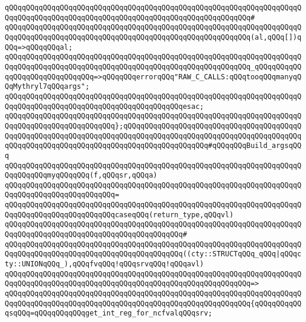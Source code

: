 \verb|qQQqqQQqqQQqqQQqqQQqqQQqqQQqqQQqqQQqqQQqqQQqqQQqqQQqqQQqqQQqqQQqqQQqqQQqqQQqqQQqqQQqqQQqqQQqqQQqqQQqqQQqqQQqqQQqqQQqqQQqqQQqqQQq#|\newline
\verb|qQQqqQQqqQQqqQQqqQQqqQQqqQQqqQQqqQQqqQQqqQQqqQQqqQQqqQQqqQQqqQQqqQQqqQQqqQQqqQQqqQQqqQQqqQQqqQQqqQQqqQQqqQQqqQQqqQQqqQQqqQQqqQQq(al,qQQq[])qQQq=>qQQqqQQqal;|\newline
\verb|qQQqqQQqqQQqqQQqqQQqqQQqqQQqqQQqqQQqqQQqqQQqqQQqqQQqqQQqqQQqqQQqqQQqqQQqqQQqqQQqqQQqqQQqqQQqqQQqqQQqqQQqqQQqqQQqqQQqqQQqqQQqqQQq_qQQqqQQqqQQqqQQqqQQqqQQqqQQqqQQq=>qQQqqQQqerrorqQQq"RAW_C_CALLS:qQQqtooqQQqmanyqQQqMythryl7qQQqargs";|\newline
\verb|qQQqqQQqqQQqqQQqqQQqqQQqqQQqqQQqqQQqqQQqqQQqqQQqqQQqqQQqqQQqqQQqqQQqqQQqqQQqqQQqqQQqqQQqqQQqqQQqqQQqqQQqqQQqqQQqesac;|\newline
\newline
\verb|qQQqqQQqqQQqqQQqqQQqqQQqqQQqqQQqqQQqqQQqqQQqqQQqqQQqqQQqqQQqqQQqqQQqqQQqqQQqqQQqqQQqqQQqqQQqqQQq};qQQqqQQqqQQqqQQqqQQqqQQqqQQqqQQqqQQqqQQqqQQqqQQqqQQqqQQqqQQqqQQqqQQqqQQqqQQqqQQqqQQqqQQqqQQqqQQqqQQqqQQqqQQqqQQqqQQqqQQqqQQqqQQqqQQqqQQqqQQqqQQqqQQqqQQqqQQqqQQq#qQQqqQQqBuild_argsqQQq|\newline
\newline
\verb|qQQqqQQqqQQqqQQqqQQqqQQqqQQqqQQqqQQqqQQqqQQqqQQqqQQqqQQqqQQqqQQqqQQqqQQqqQQqqQQqmyqQQqqQQq(f,qQQqsr,qQQqa)|\newline
\verb|qQQqqQQqqQQqqQQqqQQqqQQqqQQqqQQqqQQqqQQqqQQqqQQqqQQqqQQqqQQqqQQqqQQqqQQqqQQqqQQqqQQqqQQqqQQqqQQq=|\newline
\verb|qQQqqQQqqQQqqQQqqQQqqQQqqQQqqQQqqQQqqQQqqQQqqQQqqQQqqQQqqQQqqQQqqQQqqQQqqQQqqQQqqQQqqQQqqQQqqQQqcaseqQQq(return_type,qQQqvl)|\newline
\verb|qQQqqQQqqQQqqQQqqQQqqQQqqQQqqQQqqQQqqQQqqQQqqQQqqQQqqQQqqQQqqQQqqQQqqQQqqQQqqQQqqQQqqQQqqQQqqQQqqQQqqQQqqQQqqQQq#|\newline
\verb|qQQqqQQqqQQqqQQqqQQqqQQqqQQqqQQqqQQqqQQqqQQqqQQqqQQqqQQqqQQqqQQqqQQqqQQqqQQqqQQqqQQqqQQqqQQqqQQqqQQqqQQqqQQqqQQq((cty::STRUCTqQQq_qQQq|\verb#|qQQqcty::UNIONqQQq_),qQQqfvqQQq!qQQqsrvqQQq!qQQqavl)#\newline
\verb|qQQqqQQqqQQqqQQqqQQqqQQqqQQqqQQqqQQqqQQqqQQqqQQqqQQqqQQqqQQqqQQqqQQqqQQqqQQqqQQqqQQqqQQqqQQqqQQqqQQqqQQqqQQqqQQqqQQqqQQqqQQqqQQq=>|\newline
\verb|qQQqqQQqqQQqqQQqqQQqqQQqqQQqqQQqqQQqqQQqqQQqqQQqqQQqqQQqqQQqqQQqqQQqqQQqqQQqqQQqqQQqqQQqqQQqqQQqqQQqqQQqqQQqqQQqqQQqqQQqqQQqqQQq{qQQqqQQqqQQqsqQQq=qQQqqQQqqQQqget_int_reg_for_ncfvalqQQqsrv;|\newline

